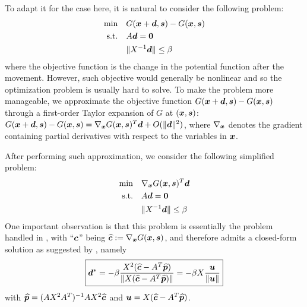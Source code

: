 \begin{enumerate}
To adapt it for the case here, it is natural to consider the following problem:
\begin{align*}
\text{min}\quad&G(\bm{x}+\bm{d},\bm{s})-G(\bm{x},\bm{s}) \\
\text{s.t.}\quad&A\bm{d}=\bm{0} \\
&\|X^{-1}\bm{d}\|\le\beta
\end{align*}
where the objective function is the change in the potential function after the
movement. However, such objective would generally be nonlinear and so the
optimization problem is usually hard to solve. To make the problem more
manageable, we approximate the objective function
\(G(\bm{x}+\bm{d},\bm{s})-G(\bm{x},\bm{s})\) through a first-order
Taylor expansion of \(G\) at \((\bm{x},\bm{s})\):
\(G(\bm{x}+\bm{d},\bm{s})-G(\bm{x},\bm{s})
=\nabla_{\bm{x}}G(\bm{x},\bm{s})^{T}\bm{d}+O(\|\bm{d}\|^{2})\), where
\(\nabla_{\bm{x}}\) denotes the gradient containing partial derivatives with
respect to the variables in \(\bm{x}\).

After performing such approximation, we consider the following simplified
problem:
\begin{align*}
\text{min}\quad&\nabla_{\bm{x}}G(\bm{x},\bm{s})^{T}\bm{d} \\
\text{s.t.}\quad&A\bm{d}=\bm{0} \\
&\|X^{-1}\bm{d}\|\le\beta
\end{align*}
One important observation is that this problem is essentially the problem
handled in , with ``\(\bm{c}\)'' being
\(\widehat{\bm{c}}:=\nabla_{\bm{x}}G(\bm{x},\bm{s})\), and therefore
admits a closed-form solution as suggested by ,
namely
\[
\boxed{\bm{d}^{*}=-\beta\frac{X^{2}(\widehat{\bm{c}}-A^{T}\widehat{\bm{p}})}
{\|X(\widehat{\bm{c}}-A^{T}\widehat{\bm{p}})\|}
=-\beta X\frac{\bm{u}}{\|\bm{u}\|}}
\]
with \(\widehat{\bm{p}}=(AX^{2}A^{T})^{-1}AX^{2}\widehat{\bm{c}}\)
and \(\bm{u}=X(\widehat{\bm{c}}-A^{T}\widehat{\bm{p}})\).


\end{enumerate}
